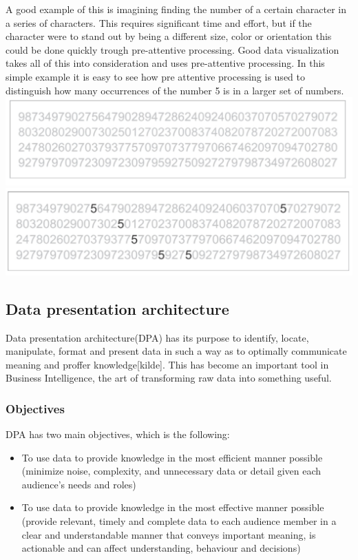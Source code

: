 A good example of this is imagining finding the number of a certain character in a series of characters. This requires significant time and effort, but if the character were to stand out by being a different size, color or orientation this could be done quickly trough pre-attentive processing. Good data visualization takes all of this into consideration and uses pre-attentive processing.
In this simple example it is easy to see how pre attentive processing is used to distinguish how many occurrences of the number 5 is in a larger set of numbers. 
\newline
\includegraphics[scale=0.2]{attentive}
\newline
\includegraphics[scale=0.2]{pre_attentive}

\subsection{Data presentation architecture}
Data presentation architecture(DPA) has its purpose to identify, locate, manipulate, format and present data in such a way as to optimally communicate meaning and proffer knowledge[kilde]. This has become an important tool in Business Intelligence, the art of transforming raw data into something useful. 

\subsubsection{Objectives}
DPA has two main objectives, which is the following:

\begin{itemize}
\item To use data to provide knowledge in the most efficient manner possible (minimize noise, complexity, and unnecessary data or detail given each audience's needs and roles)
\item To use data to provide knowledge in the most effective manner possible (provide relevant, timely and complete data to each audience member in a clear and understandable manner that conveys important meaning, is actionable and can affect understanding, behaviour and decisions)
\end{itemize}

